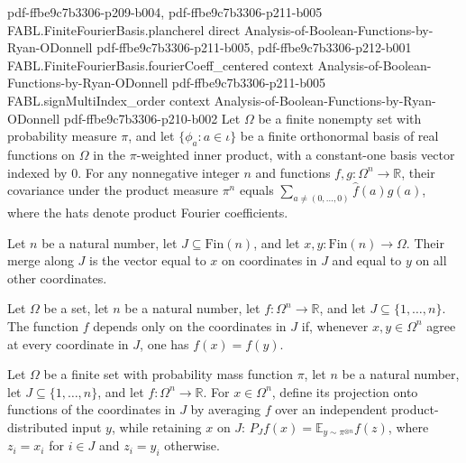 \begin{theorem}
  {pdf-ffbe9c7b3306-p209-b004,
    pdf-ffbe9c7b3306-p211-b005}
\proofstep
  {FABL.FiniteFourierBasis.plancherel}
  {direct}
  {Analysis-of-Boolean-Functions-by-Ryan-ODonnell}
  {pdf-ffbe9c7b3306-p211-b005,
    pdf-ffbe9c7b3306-p212-b001}
\proofstep
  {FABL.FiniteFourierBasis.fourierCoeff_centered}
  {context}
  {Analysis-of-Boolean-Functions-by-Ryan-ODonnell}
  {pdf-ffbe9c7b3306-p211-b005}
\proofstep
  {FABL.signMultiIndex_order}
  {context}
  {Analysis-of-Boolean-Functions-by-Ryan-ODonnell}
  {pdf-ffbe9c7b3306-p210-b002}
Let $\Omega$ be a finite nonempty set with probability measure $\pi$, and let
$\{\phi_a:a\in\iota\}$ be a finite orthonormal basis of real functions on $\Omega$ in
the $\pi$-weighted inner product, with a constant-one basis vector indexed by $0$. For
any nonnegative integer $n$ and functions $f,g:\Omega^n\to\mathbb R$, their covariance
under the product measure $\pi^n$ equals $\sum_{a\ne(0,\ldots,0)}\widehat f(a)\widehat
g(a)$, where the hats denote product Fourier coefficients.
\end{theorem}

\begin{definition}
\label{FABL.mergeOnCoordinates}
\leanok
Let $n$ be a natural number, let $J\subseteq\mathrm{Fin}(n)$, and let
$x,y:\mathrm{Fin}(n)\to\Omega$. Their merge along $J$ is the vector equal to $x$ on
coordinates in $J$ and equal to $y$ on all other coordinates.
\end{definition}

\begin{definition}
\label{FABL.DependsOnlyOnCoordinates}
\leanok
{}
Let $\Omega$ be a set, let $n$ be a natural number, let $f:\Omega^n\to\mathbb R$, and
let $J\subseteq\{1,\ldots,n\}$. The function $f$ depends only on the coordinates in $J$
if, whenever $x,y\in\Omega^n$ agree at every coordinate in $J$, one has $f(x)=f(y)$.
\end{definition}

\begin{definition}
\label{FABL.projectOnCoordinates}
\leanok
{}
Let $\Omega$ be a finite set with probability mass function $\pi$, let $n$ be a natural
number, let $J\subseteq\{1,\ldots,n\}$, and let $f:\Omega^n\to\mathbb R$. For
$x\in\Omega^n$, define its projection onto functions of the coordinates in $J$ by
averaging $f$ over an independent product-distributed input $y$, while retaining $x$ on
$J$: $P_Jf(x)=\mathbb E_{y\sim\pi^{\otimes n}} f(z)$, where $z_i=x_i$ for $i\in J$ and
$z_i=y_i$ otherwise.
\end{definition}

